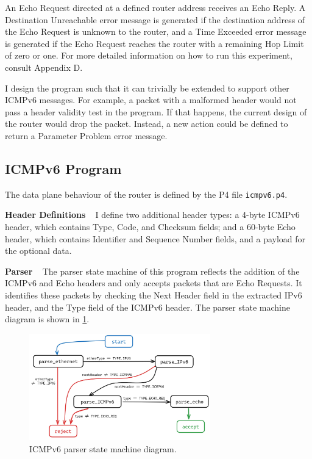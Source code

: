 An Echo Request directed at a defined router address receives an Echo Reply. A Destination Unreachable error message is generated if the destination address of the Echo Request is unknown to the router, and a Time Exceeded error message is generated if the Echo Request reaches the router with a remaining Hop Limit of zero or one. For more detailed information on how to run this experiment, consult Appendix D.

I design the program such that it can trivially be extended to support other ICMPv6 messages. For example, a packet with a malformed header would not pass a header validity test in the program. If that happens, the current design of the router would drop the packet. Instead, a new action could be defined to return a Parameter Problem error message.



\subsection{ICMPv6 Program}
\label{sec:3.5.3}

The data plane behaviour of the router is defined by the P4 file \texttt{icmpv6.p4}.

\textbf{Header Definitions} ~ I define two additional header types: a 4-byte ICMPv6 header, which contains Type, Code, and Checksum fields; and a 60-byte Echo header, which contains Identifier and Sequence Number fields, and a payload for the optional data.

\textbf{Parser} ~ The parser state machine of this program reflects the addition of the ICMPv6 and Echo headers and only accepts packets that are Echo Requests. It identifies these packets by checking the Next Header field in the extracted IPv6 header, and the Type field of the ICMPv6 header. The parser state machine diagram is shown in \cref{fig:impl-icmpv6parser}.

\begin{figure}[htbp]
  \centering
    \includegraphics[width=0.70\textwidth]{figures/implementation/icmpv6_parser.jpg}
     \caption{ICMPv6 parser state machine diagram.}
     \label{fig:impl-icmpv6parser}
\end{figure}

